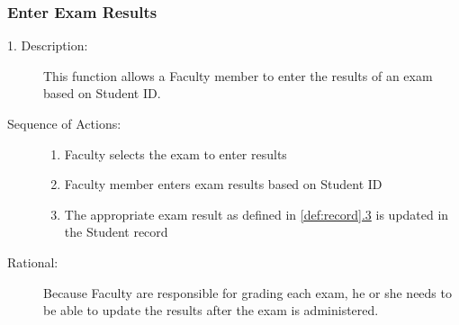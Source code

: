    \subsubsection{\large Enter Exam Results} 
   \begin{boxed} %
      \begin{description}
            \item[1. Description:\label{desc:enter_results}]
      This function allows a Faculty member to enter the results of an exam
      based on Student ID.
         
            \item[Sequence of Actions:]\hspace{10cm}
         \begin{enumerate}
               
            \item Faculty selects the exam to enter results
            \item Faculty member enters exam results based on Student ID
            \item The appropriate exam result as defined in \autoref{def:record}\hyperref[def:record]{.3} is updated in the Student record
         \end{enumerate}

            \item[Rational:]
         Because Faculty are responsible for grading each exam, he or she needs
         to be able to update the results after the exam is administered.
      \end{description}
   \end{boxed} %


